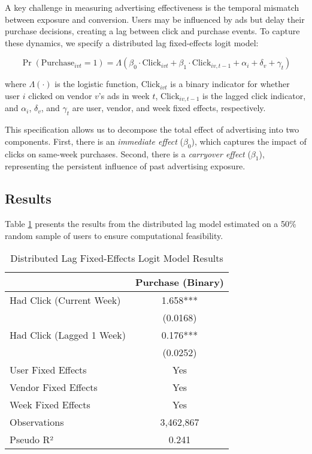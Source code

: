 A key challenge in measuring advertising effectiveness is the temporal mismatch between exposure and conversion. Users may be influenced by ads but delay their purchase decisions, creating a lag between click and purchase events. To capture these dynamics, we specify a distributed lag fixed-effects logit model:

\begin{equation}
\Pr(\text{Purchase}_{ivt} = 1) = \Lambda(\beta_0 \cdot \text{Click}_{ivt} + \beta_1 \cdot \text{Click}_{iv,t-1} + \alpha_i + \delta_v + \gamma_t)
\end{equation}

where $\Lambda(\cdot)$ is the logistic function, $\text{Click}_{ivt}$ is a binary indicator for whether user $i$ clicked on vendor $v$'s ads in week $t$, $\text{Click}_{iv,t-1}$ is the lagged click indicator, and $\alpha_i$, $\delta_v$, and $\gamma_t$ are user, vendor, and week fixed effects, respectively.

This specification allows us to decompose the total effect of advertising into two components. First, there is an \textit{immediate effect} ($\beta_0$), which captures the impact of clicks on same-week purchases. Second, there is a \textit{carryover effect} ($\beta_1$), representing the persistent influence of past advertising exposure.

\subsection*{Results}

Table \ref{tab:uvw_distlag_results} presents the results from the distributed lag model estimated on a 50\% random sample of users to ensure computational feasibility.

\begin{table}[htbp!]
\centering
\caption{Distributed Lag Fixed-Effects Logit Model Results}
\label{tab:uvw_distlag_results}
\begin{tabular}{lc}
\toprule
 & Purchase (Binary) \\
\midrule
Had Click (Current Week) & 1.658*** \\
 & (0.0168) \\
Had Click (Lagged 1 Week) & 0.176*** \\
 & (0.0252) \\
\midrule
User Fixed Effects & Yes \\
Vendor Fixed Effects & Yes \\
Week Fixed Effects & Yes \\
Observations & 3,462,867 \\
Pseudo R² & 0.241 \\
\bottomrule
\end{tabular}
\end{table}

